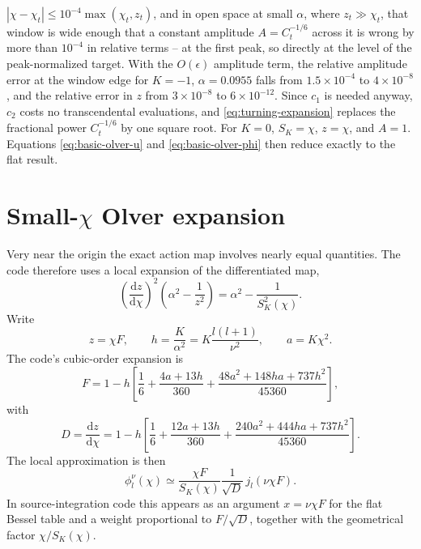 \documentclass[11pt,a4paper]{article}
\newcommand{\dd}{\mathrm{d}}
\newcommand{\SK}{S_K}
\begin{document}
\(|\chi-\chi_t|\le10^{-4}\max(\chi_t,z_t)\), and in open space at small
\(\alpha\), where \(z_t\gg\chi_t\), that window is wide enough that a constant
amplitude \(A=C_t^{-1/6}\) across it is wrong by more than \(10^{-4}\) in
relative terms -- at the first peak, so directly at the level of the
peak-normalized target.  With the \(O(\epsilon)\) amplitude term, the relative
amplitude error at the window edge for \(K=-1\), \(\alpha=0.0955\) falls from
\(1.5\times10^{-4}\) to \(4\times10^{-8}\), and the relative error in \(z\) from
\(3\times10^{-8}\) to \(6\times10^{-12}\).  Since \(c_1\) is needed anyway,
\(c_2\) costs no transcendental evaluations, and \eqref{eq:turning-expansion}
replaces the fractional power \(C_t^{-1/6}\) by one square root.
For \(K=0\), \(\SK=\chi\), \(z=\chi\), and \(A=1\).  Equations \eqref{eq:basic-olver-u} and \eqref{eq:basic-olver-phi} then reduce exactly to the flat result.

\section{Small-\texorpdfstring{\(\chi\)}{chi} Olver expansion}

Very near the origin the exact action map involves nearly equal quantities.  The code therefore uses a local expansion of the differentiated map,
\begin{equation}
  \left(\frac{\dd z}{\dd\chi}\right)^2
  \left(\alpha^2-\frac{1}{z^2}\right)
  =\alpha^2-\frac{1}{\SK^2(\chi)}.
  \label{eq:differentiated-map}
\end{equation}
Write
\begin{equation}
  z=\chi F,\qquad
  h=\frac{K}{\alpha^2}=K\frac{l(l+1)}{\nu^2},\qquad
  a=K\chi^2.
\end{equation}
The code's cubic-order expansion is
\begin{equation}
  F=1-h\left[\frac{1}{6}+\frac{4a+13h}{360}
  +\frac{48a^2+148ha+737h^2}{45360}\right],
  \label{eq:F-smallchi}
\end{equation}
with
\begin{equation}
  D=\frac{\dd z}{\dd\chi}=1-h\left[\frac{1}{6}+\frac{12a+13h}{360}
  +\frac{240a^2+444ha+737h^2}{45360}\right].
  \label{eq:D-smallchi}
\end{equation}
The local approximation is then
\begin{equation}
  \phi_l^\nu(\chi)\simeq
  \frac{\chi F}{\SK(\chi)}\frac{1}{\sqrt D}\,j_l(\nu\chi F).
  \label{eq:smallchi-olver-phi}
\end{equation}
In source-integration code this appears as an argument \(x=\nu\chi F\) for the flat Bessel table and a weight proportional to \(F/\sqrt D\), together with the geometrical factor \(\chi/\SK(\chi)\).
\end{document}
